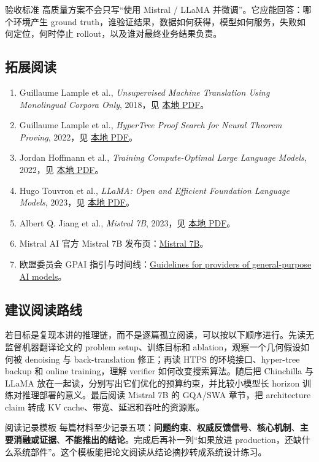 \documentclass[a4paper]{article}
\begin{document}
\begin{knowledgebox}{验收标准}
高质量方案不会只写“使用 Mistral / LLaMA 并微调”。它应能回答：哪个环境产生 ground truth，谁验证结果，数据如何获得，模型如何服务，失败如何定位，何时停止 rollout，以及谁对最终业务结果负责。
\end{knowledgebox}

\subsection{拓展阅读}

\begin{enumerate}
  \item Guillaume Lample et al., \emph{Unsupervised Machine Translation Using Monolingual Corpora Only}, 2018，见 \href{run:source-materials/unsupervised-machine-translation.pdf}{本地 PDF}。
  \item Guillaume Lample et al., \emph{HyperTree Proof Search for Neural Theorem Proving}, 2022，见 \href{run:source-materials/hypertree-proof-search.pdf}{本地 PDF}。
  \item Jordan Hoffmann et al., \emph{Training Compute-Optimal Large Language Models}, 2022，见 \href{run:source-materials/chinchilla-scaling-laws.pdf}{本地 PDF}。
  \item Hugo Touvron et al., \emph{LLaMA: Open and Efficient Foundation Language Models}, 2023，见 \href{run:source-materials/llama.pdf}{本地 PDF}。
  \item Albert Q. Jiang et al., \emph{Mistral 7B}, 2023，见 \href{run:source-materials/mistral-7b.pdf}{本地 PDF}。
  \item Mistral AI 官方 Mistral 7B 发布页：\href{https://mistral.ai/news/announcing-mistral-7b}{Mistral 7B}。
  \item 欧盟委员会 GPAI 指引与时间线：\href{https://digital-strategy.ec.europa.eu/en/policies/guidelines-gpai-providers}{Guidelines for providers of general-purpose AI models}。
\end{enumerate}

\subsection{建议阅读路线}

若目标是复现本讲的推理链，而不是逐篇孤立阅读，可以按以下顺序进行。先读无监督机器翻译论文的 problem setup、训练目标和 ablation，观察一个几何假设如何被 denoising 与 back-translation 修正；再读 HTPS 的环境接口、hyper-tree backup 和 online training，理解 verifier 如何改变搜索算法。随后把 Chinchilla 与 LLaMA 放在一起读，分别写出它们优化的预算约束，并比较小模型长 horizon 训练对推理部署的意义。最后阅读 Mistral 7B 的 GQA/SWA 章节，把 architecture claim 转成 KV cache、带宽、延迟和吞吐的资源账。

\begin{knowledgebox}{阅读记录模板}
每篇材料至少记录五项：\textbf{问题约束}、\textbf{权威反馈信号}、\textbf{核心机制}、\textbf{主要消融或证据}、\textbf{不能推出的结论}。完成后再补一列“如果放进 production，还缺什么系统部件”。这个模板能把论文阅读从结论摘抄转成系统设计练习。
\end{knowledgebox}
\end{document}
